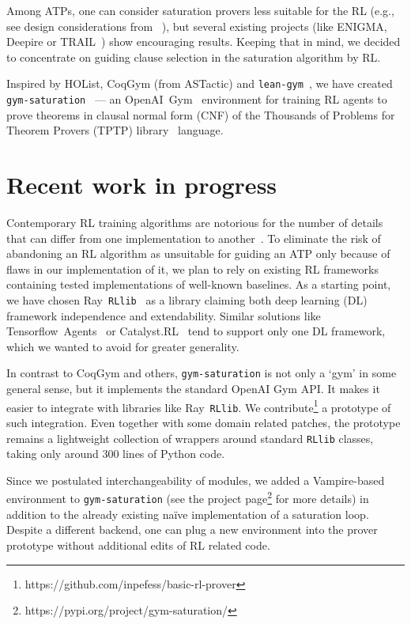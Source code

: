 \documentclass{easychair}
\begin{document}
Among ATPs, one can consider saturation provers less suitable for the RL (e.g., see design considerations from ~\cite{10.1007/978-3-030-29007-8_3}), but several existing projects (like ENIGMA, Deepire or TRAIL~\cite{Crouse_Abdelaziz_Makni_Whitehead_Cornelio_Kapanipathi_Srinivas_Thost_Witbrock_Fokoue_2021}) show encouraging results. Keeping that in mind, we decided to concentrate on guiding clause selection in the saturation algorithm by RL.

Inspired by HOList, CoqGym (from ASTactic) and \texttt{lean-gym}~\cite{DBLP:journals/corr/abs-2202-01344}, we have created \texttt{gym-saturation}~\cite{Shminke2022} --- an OpenAI~Gym~\cite{DBLP:journals/corr/BrockmanCPSSTZ16} environment for training RL agents to prove theorems in clausal normal form (CNF) of the Thousands of Problems for Theorem Provers (TPTP) library~\cite{DBLP:journals/jar/Sutcliffe17} language.

\section{Recent work in progress}
Contemporary RL training algorithms are notorious for the number of details that can differ from one implementation to another~\cite{Henderson_Islam_Bachman_Pineau_Precup_Meger_2018}. To eliminate the risk of abandoning an RL algorithm as unsuitable for guiding an ATP only because of flaws in our implementation of it, we plan to rely on existing RL frameworks containing tested implementations of well-known baselines. As a starting point, we have chosen Ray~\texttt{RLlib}~\cite{DBLP:journals/corr/abs-1712-09381} as a library claiming both deep learning (DL) framework independence and extendability. Similar solutions like Tensorflow~Agents~\cite{DBLP:journals/corr/abs-1709-02878} or Catalyst.RL~\cite{DBLP:journals/corr/abs-1903-00027} tend to support only one DL framework, which we wanted to avoid for greater generality.

In contrast to CoqGym and others, \texttt{gym-saturation} is not only a `gym' in some general sense, but it implements the standard OpenAI Gym API. It makes it easier to integrate with libraries like Ray~\texttt{RLlib}. We contribute\footnote{https://github.com/inpefess/basic-rl-prover} a prototype of such integration. Even together with some domain related patches, the prototype remains a lightweight collection of wrappers around standard \texttt{RLlib} classes, taking only around 300 lines of Python code.

Since we postulated interchangeability of modules, we added a Vampire-based environment to \texttt{gym-saturation} (see the project page\footnote{https://pypi.org/project/gym-saturation/} for more details) in addition to the already existing naïve implementation of a saturation loop. Despite a different backend, one can plug a new environment into the prover prototype without additional edits of RL related code.
\end{document}
